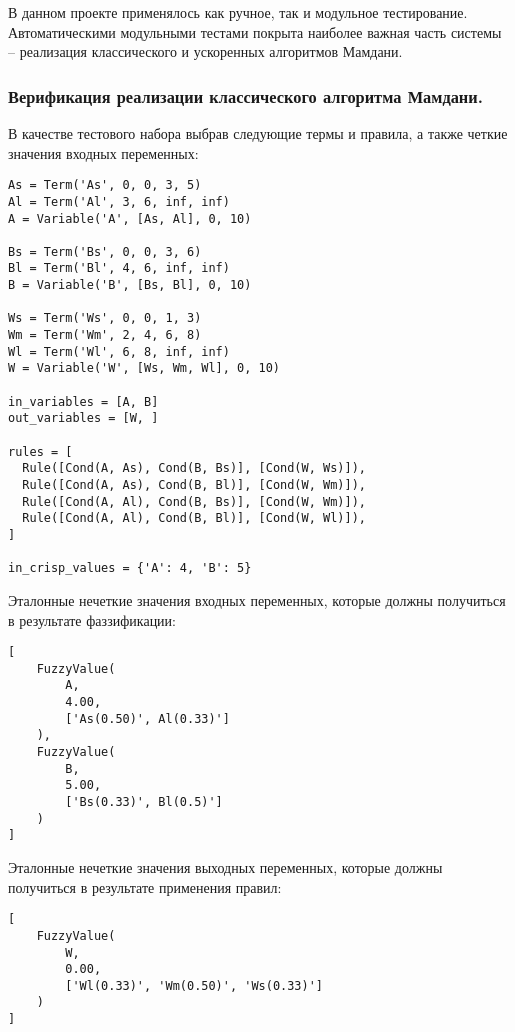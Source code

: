 В данном проекте применялось как ручное, так и модульное тестирование. Автоматическими модульными тестами покрыта наиболее важная часть системы – реализация классического и ускоренных алгоритмов Мамдани.

\subsubsection{Верификация реализации классического алгоритма Мамдани. }

В качестве тестового набора выбрав следующие термы и правила, а также четкие значения входных переменных:

\begin{lstlisting}[style=pythonstyle,caption={  }, label=lst:func:1]
As = Term('As', 0, 0, 3, 5)
Al = Term('Al', 3, 6, inf, inf)
A = Variable('A', [As, Al], 0, 10)

Bs = Term('Bs', 0, 0, 3, 6)
Bl = Term('Bl', 4, 6, inf, inf)
B = Variable('B', [Bs, Bl], 0, 10)

Ws = Term('Ws', 0, 0, 1, 3)
Wm = Term('Wm', 2, 4, 6, 8)
Wl = Term('Wl', 6, 8, inf, inf)
W = Variable('W', [Ws, Wm, Wl], 0, 10)

in_variables = [A, B]
out_variables = [W, ]

rules = [
  Rule([Cond(A, As), Cond(B, Bs)], [Cond(W, Ws)]),
  Rule([Cond(A, As), Cond(B, Bl)], [Cond(W, Wm)]),
  Rule([Cond(A, Al), Cond(B, Bs)], [Cond(W, Wm)]),
  Rule([Cond(A, Al), Cond(B, Bl)], [Cond(W, Wl)]),
]

in_crisp_values = {'A': 4, 'B': 5}
\end{lstlisting}

Эталонные нечеткие значения входных переменных, которые должны получиться в результате фаззификации:

\begin{lstlisting}[style=pythonstyle,caption={  }, label=lst:func:1]
[
	FuzzyValue(
		A, 
		4.00, 
		['As(0.50)', Al(0.33)']
	), 
	FuzzyValue(
		B, 
		5.00, 
		['Bs(0.33)', Bl(0.5)']
	)
]

\end{lstlisting}

Эталонные нечеткие значения выходных переменных, которые должны получиться в результате применения правил:

\begin{lstlisting}[style=pythonstyle,caption={  }, label=lst:func:1]
[
	FuzzyValue(
		W, 
		0.00, 
		['Wl(0.33)', 'Wm(0.50)', 'Ws(0.33)']
	)
]
\end{lstlisting}

